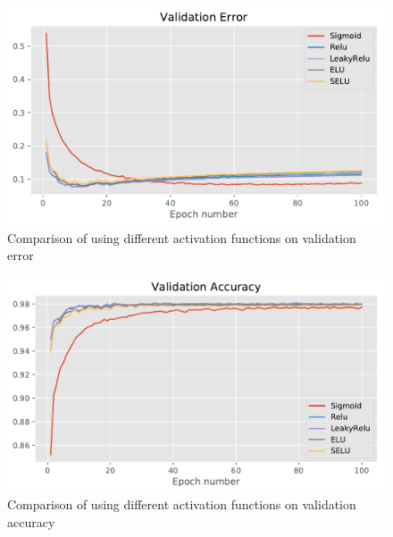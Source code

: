 \documentclass{article}
\begin{document}
\begin{figure}[tb]
\vskip 5mm
\begin{center}
\centerline{\includegraphics[width=\columnwidth]{activations_error}}
\caption{Comparison of using different activation functions on validation error}
\label{fig:act-val-err}
\end{center}
\vskip -5mm
\end{figure} 

\begin{figure}[tb]
\vskip 5mm
\begin{center}
\centerline{\includegraphics[width=\columnwidth]{activations_acc}}
\caption{Comparison of using different activation functions on validation accuracy}
\label{fig:act-val-acc}
\end{center}
\vskip -5mm
\end{figure} 
\end{document}
